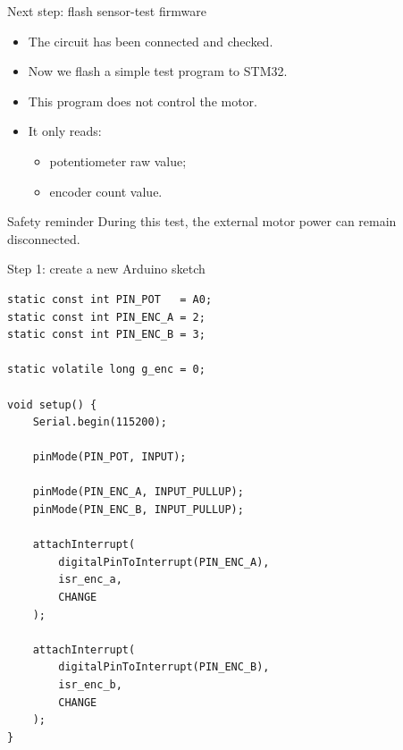 \documentclass[aspectratio=169]{beamer}
\begin{document}
\begin{frame}{Next step: flash sensor-test firmware}

\begin{itemize}
    \item The circuit has been connected and checked.
    \vspace{0.35cm}

    \item Now we flash a simple test program to STM32.
    \vspace{0.35cm}

    \item This program does not control the motor.
    \vspace{0.35cm}

    \item It only reads:
    \vspace{0.15cm}
    \begin{itemize}
        \item potentiometer raw value;
        \item encoder count value.
    \end{itemize}
\end{itemize}

\vspace{0.25cm}

\begin{alertblock}{Safety reminder}
\small
During this test, the external motor power can remain disconnected.
\end{alertblock}

\end{frame}







\begin{frame}[fragile]{Step 1: create a new Arduino sketch}



\begin{lstlisting}[basicstyle=\ttfamily\tiny]
static const int PIN_POT   = A0;
static const int PIN_ENC_A = 2;
static const int PIN_ENC_B = 3;

static volatile long g_enc = 0;

void setup() {
    Serial.begin(115200);

    pinMode(PIN_POT, INPUT);

    pinMode(PIN_ENC_A, INPUT_PULLUP);
    pinMode(PIN_ENC_B, INPUT_PULLUP);

    attachInterrupt(
        digitalPinToInterrupt(PIN_ENC_A),
        isr_enc_a,
        CHANGE
    );

    attachInterrupt(
        digitalPinToInterrupt(PIN_ENC_B),
        isr_enc_b,
        CHANGE
    );
}
\end{lstlisting}

\end{frame}
\end{document}

